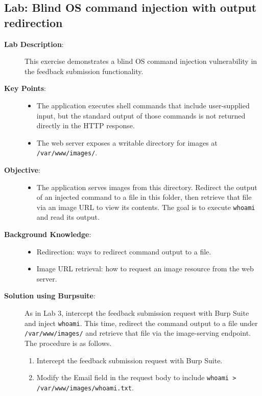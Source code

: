 \documentclass{article}
\begin{document}
\subsection*{Lab: Blind OS command injection with output redirection}
\begin{description}
  \item[\textbf{Lab Description}:] This exercise demonstrates a blind OS command injection vulnerability in the feedback submission functionality.
  \item[\textbf{Key Points}:]\leavevmode\par
    \begin{itemize}
      \item The application executes shell commands that include user-supplied input, but the standard output of those commands is not returned directly in the HTTP response.
      \item The web server exposes a writable directory for images at \texttt{/var/www/images/}.
    \end{itemize}

  \item[\textbf{Objective}:] \leavevmode\par
    \begin{itemize}
      \item The application serves images from this directory. Redirect the output of an injected command to a file in this folder, then retrieve that file via an image URL to view its contents. The goal is to execute \texttt{whoami} and read its output.
    \end{itemize}

  \item[\textbf{Background Knowledge}:]\leavevmode\par
    \begin{itemize}
      \item Redirection: ways to redirect command output to a file.
      \item Image URL retrieval: how to request an image resource from the web server.
    \end{itemize}

  \item[\textbf{Solution using Burpsuite}:] \leavevmode\par
    As in Lab 3, intercept the feedback submission request with Burp Suite and inject \texttt{whoami}. This time, redirect the command output to a file under \texttt{/var/www/images/} and retrieve that file via the image-serving endpoint. The procedure is as follows.
  \begin{enumerate}
    \item Intercept the feedback submission request with Burp Suite.
    \item Modify the Email field in the request body to include \texttt{whoami > /var/www/images/whoami.txt}.
    

\end{enumerate}
\end{description}
\end{document}
